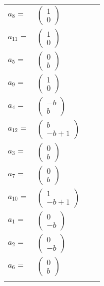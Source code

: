 \documentclass[1p]{elsarticle_modified}
\theoremstyle{definition}
\begin{document}
\begin{tabular}{m{7pt} m{180pt} m{7pt} m{180pt} }
\flushright $a_{8}=$&$\begin{pmatrix}1\\0\end{pmatrix}$ \\
\flushright $a_{11}=$&$\begin{pmatrix}1\\0\end{pmatrix}$ \\
\flushright $a_{5}=$&$\begin{pmatrix}0\\b\end{pmatrix}$ \\
\flushright $a_{9}=$&$\begin{pmatrix}1\\0\end{pmatrix}$ \\
\flushright $a_{4}=$&$\begin{pmatrix}- b\\b\end{pmatrix}$ \\
\flushright $a_{12}=$&$\begin{pmatrix}b\\- b+1\end{pmatrix}$ \\
\flushright $a_{3}=$&$\begin{pmatrix}0\\b\end{pmatrix}$ \\
\flushright $a_{7}=$&$\begin{pmatrix}0\\b\end{pmatrix}$ \\
\flushright $a_{10}=$&$\begin{pmatrix}1\\- b+1\end{pmatrix}$ \\
\flushright $a_{1}=$&$\begin{pmatrix}0\\- b\end{pmatrix}$ \\
\flushright $a_{2}=$&$\begin{pmatrix}0\\- b\end{pmatrix}$ \\
\flushright $a_{6}=$&$\begin{pmatrix}0\\b\end{pmatrix}$\\&\end{tabular}
\end{document}
